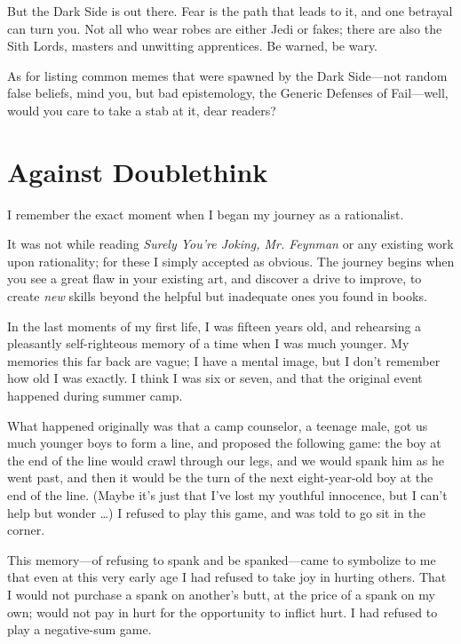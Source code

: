 {
 But the Dark Side is out there. Fear is the path that leads to it,
and one betrayal can turn you. Not all who wear robes are either Jedi
or fakes; there are also the Sith Lords, masters and unwitting
apprentices. Be warned, be wary.}

{
 As for listing common memes that were spawned by the Dark
Side---not random false beliefs, mind you, but bad epistemology, the
Generic Defenses of Fail---well, would you care to take a stab at it,
dear readers?}

\myendsectiontext

\chapter{Against Doublethink}


{
 I remember the exact moment when I began my journey as a
rationalist. }

{
 It was not while reading \textit{Surely You're
Joking, Mr. Feynman} or any existing work upon rationality; for these I
simply accepted as obvious. The journey begins when you see a great
flaw in your existing art, and discover a drive to improve, to create
\textit{new} skills beyond the helpful but inadequate ones you found in
books.}

{
 In the last moments of my first life, I was fifteen years old, and
rehearsing a pleasantly self-righteous memory of a time when I was much
younger. My memories this far back are vague; I have a mental image,
but I don't remember how old I was exactly. I think I
was six or seven, and that the original event happened during summer
camp.}

{
 What happened originally was that a camp counselor, a teenage
male, got us much younger boys to form a line, and proposed the
following game: the boy at the end of the line would crawl through our
legs, and we would spank him as he went past, and then it would be the
turn of the next eight-year-old boy at the end of the line. (Maybe
it's just that I've lost my youthful
innocence, but I can't help but wonder \ldots) I refused
to play this game, and was told to go sit in the corner.}

{
 This memory---of refusing to spank and be spanked---came to
symbolize to me that even at this very early age I had refused to take
joy in hurting others. That I would not purchase a spank on
another's butt, at the price of a spank on my own;
would not pay in hurt for the opportunity to inflict hurt. I had
refused to play a negative-sum game.}

